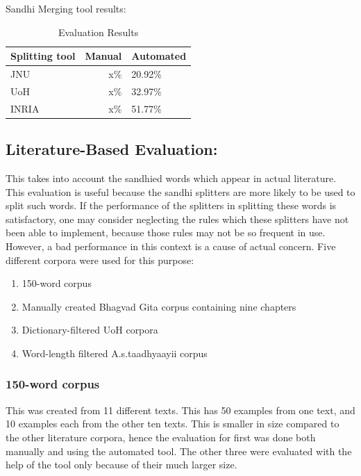 \documentclass[11pt]{article}
\begin{document}
Sandhi Merging tool results:

\begin{table}[h]
\begin{center}
\begin{tabular}{|l|rl|}
\hline \bf Splitting tool & \bf Manual \bf & Automated \\ \hline
JNU&x\%&20.92\% \\
UoH&x\%&32.97\% \\
INRIA&x\%&51.77\% \\
\hline
\end{tabular}
\end{center}
\caption{\label{font-table} Evaluation Results }
\end{table}

\subsection{Literature-Based Evaluation:}
\label{ssec:litSurvey}

This takes into account the sandhied words which appear in actual literature. This evaluation is useful because the sandhi splitters are more likely to be used to split such words. If the performance of the splitters in splitting these words is satisfactory, one may consider neglecting the rules which these splitters have not been able to implement, because those rules may not be so frequent in use. However, a bad performance in this context is a cause of actual concern. 
Five different corpora were used for this purpose:
\begin{enumerate}
\item 150-word corpus
\item  Manually created Bhagvad Gita corpus containing nine chapters
\item  Dictionary-filtered UoH corpora
\item  Word-length filtered A.s.taadhyaayii corpus
\end{enumerate}

\subsubsection{150-word corpus}

This was created from 11 different texts. This has 50 examples from one text, and 10 examples each from the other ten texts. This is smaller in size compared to the other literature corpora, hence the evaluation for first was done both manually and using the automated tool. The other three were evaluated with the help of the tool only because of their much larger size.
\end{document}
